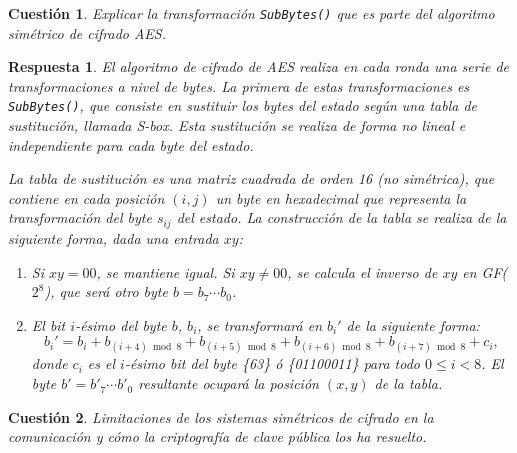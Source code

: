 \documentclass[
  a4paper,
  spanish,
  12pt,
]{scrartcl}
\theoremstyle{ejercicio-style}
\newtheorem{ejer}{Cuestión}
\theoremstyle{remark-style}
\newtheorem*{sol}{Respuesta}
\theoremstyle{teorema-style}
\begin{document}
\begin{ejer}
  Explicar la transformación \texttt{SubBytes()} que es parte del algoritmo simétrico de cifrado AES.
\end{ejer}

\begin{sol}
El algoritmo de cifrado de AES realiza en cada ronda una serie de transformaciones a nivel de bytes. La primera de estas transformaciones es \texttt{SubBytes()}, que consiste en sustituir los bytes del estado según una tabla de sustitución, llamada S-box. Esta sustitución se realiza de forma no lineal e independiente para cada byte del estado.

La tabla de sustitución es una matriz cuadrada de orden 16 (no simétrica), que contiene en cada posición $(i,j)$ un byte en hexadecimal que representa la transformación del byte $s_{ij}$ del estado. La construcción de la tabla se realiza de la siguiente forma, dada una entrada $xy$:

\begin{enumerate}
\item Si $xy = 00$, se mantiene igual. Si $xy \neq 00$, se calcula el inverso de $xy$ en GF($2^8$), que será otro byte $b = b_7\cdots b_0$.
\item El bit $i$-ésimo del byte $b$, $b_i$, se transformará en $b_i'$ de la siguiente forma:
  \[b_i' = b_i + b_{(i+4)\bmod 8} + b_{(i+5)\bmod 8} + b_{(i+6)\bmod 8} + b_{(i+7)\bmod 8} + c_i,
  \]
  donde $c_i$ es el $i$-ésimo bit del byte \{63\} ó \{01100011\} para todo $0 \leq i < 8$. El byte $b' = b'_7\cdots b'_0$ resultante ocupará la posición $(x,y)$ de la tabla.

\end{enumerate}
\end{sol}

\begin{ejer}
  Limitaciones de los sistemas simétricos de cifrado en la comunicación y cómo la criptografía de clave pública los ha resuelto.
\end{ejer}
\end{document}
